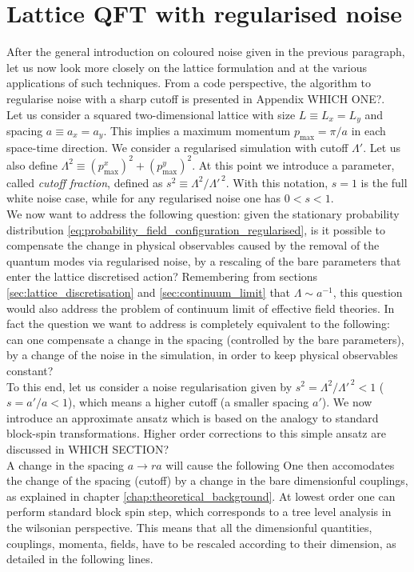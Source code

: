 \section{Lattice QFT with regularised noise}
After the general introduction on coloured noise given in the previous paragraph, let us now look more closely on the lattice formulation and at the various applications of such techniques.
From a code perspective, the algorithm to regularise noise with a sharp cutoff is presented in Appendix WHICH ONE?. \\
Let us consider a squared two-dimensional lattice with size $L \equiv L_x = L_y$ and spacing $a \equiv a_x = a_y$. This implies a maximum momentum $p_\text{max} = \pi / a$ in each space-time direction. We consider a regularised simulation with cutoff $\Lambda'$. Let us also define $\Lambda^2 \equiv (p^x_\text{max})^2 + (p^y_\text{max})^2$. At this point we introduce a parameter, called \emph{cutoff fraction}, defined as $s^2 \equiv \Lambda^2 / \Lambda'^{\,2}$. With this notation, $s=1$ is the full white noise case, while for any regularised noise one has $0 < s < 1$. \\
We now want to address the following question: given the stationary probability distribution \ref{eq:probability_field_configuration_regularised}, is it possible to compensate the change in physical observables caused by the removal of the quantum modes via regularised noise, by a rescaling of the bare parameters that enter the lattice discretised action? Remembering from sections \ref{sec:lattice_discretisation} and \ref{sec:continuum_limit} that $\Lambda \sim a^{-1}$, this question would also address the problem of continuum limit of effective field theories. In fact the question we want to address is completely equivalent to the following: can one compensate a change in the spacing (controlled by the bare parameters), by a change of the noise in the simulation, in order to keep physical observables constant?\\
To this end, let us consider a noise regularisation given by $s^2 = \Lambda^2 / \Lambda'^{\,2} < 1$ ($s = a' / a < 1$), which means a higher cutoff (a smaller spacing $a'$). We now introduce an approximate ansatz which is based on the analogy to standard block-spin transformations. Higher order corrections to this simple ansatz are discussed in WHICH SECTION? \\
A change in the spacing $a \to ra$ will cause the following
One then accomodates the change of the spacing (cutoff) by a change in the bare dimensionful couplings, as explained in chapter \ref{chap:theoretical_background}. At lowest order one can perform standard block spin step, which corresponds to a tree level analysis in the wilsonian perspective. This means that all the dimensionful quantities, couplings, momenta, fields, have to be rescaled according to their dimension, as detailed in the following lines. \\
